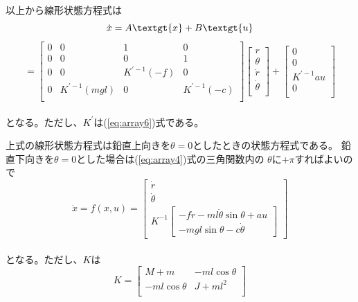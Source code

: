 	\\
	以上から線形状態方程式は\\
	\[\dot{x}=A\textgt{x}+B\textgt{u}\]
	\begin{equation}
		=\left[
		\begin{array}{cccc}
			0 & 0 & 1 & 0 \\
			0 & 0 & 0 & 1 \\
			0 & 0 & K^{'-1}(-f) & 0 \\
			0 & K^{'-1}(mgl) & 0 & K^{'-1}(-c)\\
		\end{array}
		\right]
		\left[
		\begin{array}{c}
			r\\
			\theta\\
			\dot{r}\\
			\dot{\theta}\\
		\end{array}
		\right] + 
		\left[
		\begin{array}{c}
			0\\
			0\\
			K^{'-1}au\\
			0\\
		\end{array}
		\right]
		\label{eq:InPeAboveLiner}
	\end{equation}
	\\
	となる。ただし、$K^{'}$は(\ref{eq:array6})式である。
	\par
	上式の線形状態方程式は鉛直上向きを$\theta = 0$としたときの状態方程式である。
	鉛直下向きを$\theta = 0$とした場合は(\ref{eq:array4})式の三角関数内の
	$\theta$に+$\pi$すればよいので
	\begin{equation}
		\dot{x} = f(x,u)=\left[
		\begin{array}{ccc}
			\dot{r}\\
			\dot{\theta}\\
			K^{-1}\left[
			\begin{array}{ccc}
				-f\dot{r}-ml\ddot{\theta}\sin{\theta}+au\\
				-mgl\sin{\theta}-c\dot{\theta}
			\end{array}
			\right]
		\end{array}
		\right]
		\label{eq:InPeUnderNonLiner}
	\end{equation}
	\\
	となる。ただし、$K$は
	\begin{equation}
		K=\left[
		\begin{array}{ccc}
			M+m & -ml\cos{\theta}\\
			-ml\cos{\theta} & J+ml^{2}\\
		\end{array}
		\right]
		\label{eq:InPeUnderNonLinerK}
	\end{equation}
